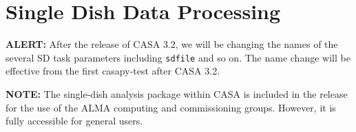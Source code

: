 

\chapter[Single Dish Data Processing]{Single Dish Data Processing}
\label{chapter:sd}


{\bf ALERT:} After the release of CASA 3.2, we will be changing the 
names of the several SD task parameters including {\tt sdfile} and 
so on. The name change will be effective from the first casapy-test 
after CASA 3.2. 

{\bf NOTE:} The single-dish analysis package within CASA 
is included in the release for the use
of the ALMA computing and commissioning groups.  
However, it is fully accessible for general users.

